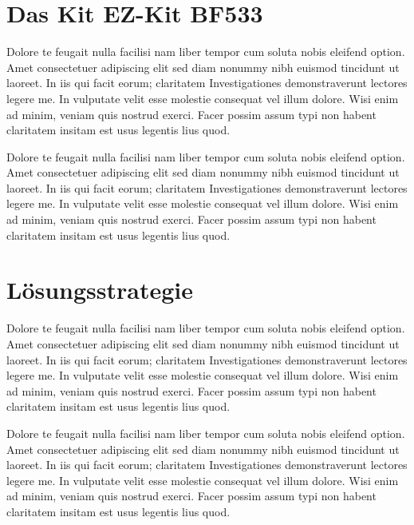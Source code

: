 \documentclass[a4paper,12pt,fontsize=12,DIV=12]{scrartcl}
\begin{document}
\section{Das Kit EZ-Kit BF533}
Dolore te feugait nulla facilisi nam liber tempor cum soluta nobis eleifend option. Amet consectetuer adipiscing elit sed diam nonummy nibh euismod tincidunt ut laoreet. In iis qui facit eorum; claritatem Investigationes demonstraverunt lectores legere me. In vulputate velit esse molestie consequat vel illum dolore. Wisi enim ad minim, veniam quis nostrud exerci. Facer possim assum typi non habent claritatem insitam est usus legentis lius quod.

Dolore te feugait nulla facilisi nam liber tempor cum soluta nobis eleifend option. Amet consectetuer adipiscing elit sed diam nonummy nibh euismod tincidunt ut laoreet. In iis qui facit eorum; claritatem Investigationes demonstraverunt lectores legere me. In vulputate velit esse molestie consequat vel illum dolore. Wisi enim ad minim, veniam quis nostrud exerci. Facer possim assum typi non habent claritatem insitam est usus legentis lius quod.

\section{Lösungsstrategie}
Dolore te feugait nulla facilisi nam liber tempor cum soluta nobis eleifend option. Amet consectetuer adipiscing elit sed diam nonummy nibh euismod tincidunt ut laoreet. In iis qui facit eorum; claritatem Investigationes demonstraverunt lectores legere me. In vulputate velit esse molestie consequat vel illum dolore. Wisi enim ad minim, veniam quis nostrud exerci. Facer possim assum typi non habent claritatem insitam est usus legentis lius quod.

Dolore te feugait nulla facilisi nam liber tempor cum soluta nobis eleifend option. Amet consectetuer adipiscing elit sed diam nonummy nibh euismod tincidunt ut laoreet. In iis qui facit eorum; claritatem Investigationes demonstraverunt lectores legere me. In vulputate velit esse molestie consequat vel illum dolore. Wisi enim ad minim, veniam quis nostrud exerci. Facer possim assum typi non habent claritatem insitam est usus legentis lius quod.
\end{document}
